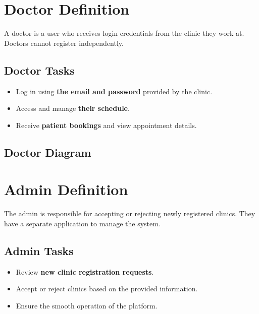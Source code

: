 \documentclass{article}
\begin{document}
\section{Doctor Definition}
A doctor is a user who receives login credentials from the clinic they work at. Doctors cannot register independently.

\subsection{Doctor Tasks}
\begin{itemize}
    \item Log in using \textbf{the email and password} provided by the clinic.
    \item Access and manage \textbf{their schedule}.
    \item Receive \textbf{patient bookings} and view appointment details.
\end{itemize}


\subsection{Doctor Diagram}

\begin{center}
\end{center}
\section{Admin Definition}
The admin is responsible for accepting or rejecting newly registered clinics. They have a separate application to manage the system.

\subsection{Admin Tasks}
\begin{itemize}
    \item Review \textbf{new clinic registration requests}.
    \item Accept or reject clinics based on the provided information.
    \item Ensure the smooth operation of the platform.
\end{itemize}
\end{document}

